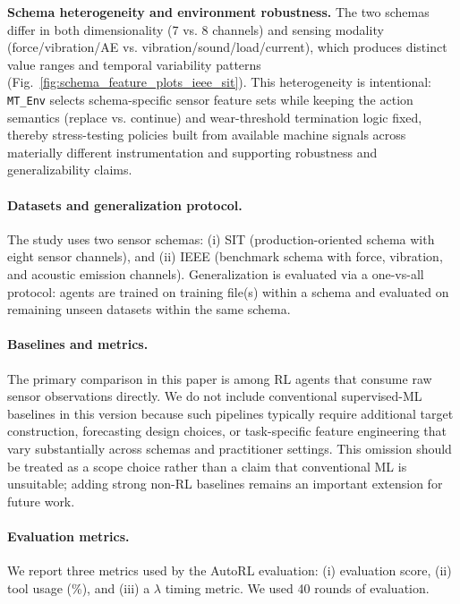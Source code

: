\documentclass[sn-basic]{sn-jnl} %
\begin{document}
\textbf{Schema heterogeneity and environment robustness.}
The two schemas differ in both dimensionality (7 vs. 8 channels) and sensing modality (force/vibration/AE vs. vibration/sound/load/current), which produces distinct value ranges and temporal variability patterns (Fig.~\ref{fig:schema_feature_plots_ieee_sit}). This heterogeneity is intentional: \texttt{MT\_Env} selects schema-specific sensor feature sets while keeping the action semantics (replace vs. continue) and wear-threshold termination logic fixed, thereby stress-testing policies built from available machine signals across materially different instrumentation and supporting robustness and generalizability claims.

\paragraph{Datasets and generalization protocol.}
The study uses two sensor schemas: (i) SIT (production-oriented schema with eight sensor channels), and (ii) IEEE (benchmark schema with force, vibration, and acoustic emission channels). Generalization is evaluated via a one-vs-all protocol: agents are trained on training file(s) within a schema and evaluated on remaining unseen datasets within the same schema.

\paragraph{Baselines and metrics.}
\label{sec:metrics}
The primary comparison in this paper is among RL agents that consume raw sensor observations directly. We do not include conventional supervised-ML baselines in this version because such pipelines typically require additional target construction, forecasting design choices, or task-specific feature engineering that vary substantially across schemas and practitioner settings. This omission should be treated as a scope choice rather than a claim that conventional ML is unsuitable; adding strong non-RL baselines remains an important extension for future work.

\paragraph{Evaluation metrics.}
We report three metrics used by the AutoRL evaluation: (i) evaluation score, (ii) tool usage (\%), and (iii) a $\lambda$ timing metric. We used 40 rounds of evaluation.
\end{document}
